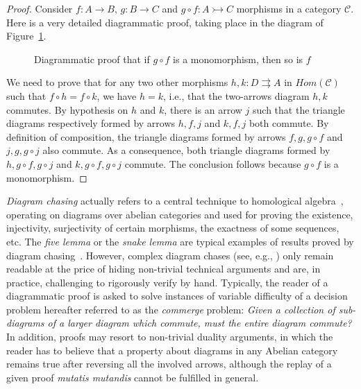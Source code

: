 \documentclass[10pt,a4paper]{article}
\renewcommand{\~}{\widetilde}
\newcommand{\Cat}{\mathcal C}
\begin{document}
\begin{proof}
  Consider $f : A \rightarrow B$, $g : B \rightarrow C$ and $g \circ f : A \rightarrowtail C$ morphisms in a category $\Cat$. Here is a very detailed diagrammatic proof, taking place in the diagram of Figure~\ref{fig:monomonom}.

  \begin{figure}[h!]
    \begin{center}
    \end{center}
    \caption{Diagrammatic proof that if $g \circ f$ is a monomorphism, then so is $f$}\label{fig:monomonom}
  \end{figure}

  We need to prove that for any two other morphisms $h,k : D \rightrightarrows A$ in $Hom(\Cat)$ such that $f \circ h = f \circ k$, we have $h = k$, i.e., that the two-arrows diagram $h, k$ commutes. By hypothesis on $h$ and $k$, there is an arrow $j$ such that the triangle diagrams respectively formed by arrows $h,f, j$ and $k, f, j$ both commute. By definition of composition, the triangle diagrams formed by arrows $f, g, g \circ f$ and $j, g, g \circ j$ also commute. As a consequence, both triangle diagrams formed by $h, g \circ f, g \circ j$ and $k, g \circ f, g \circ j$ commute. The conclusion follows because $g \circ f$ is a monomorphism.
\end{proof}

\emph{Diagram chasing} actually refers to a central technique to homological algebra~\cite{zbMATH00758278,zbMATH01324388}, operating on diagrams over abelian categories and used for proving the existence, injectivity, surjectivity of certain morphisms, the exactness of some sequences, etc. The \emph{five lemma} or the \emph{snake lemma} are typical examples of results proved by diagram chasing~\cite{zbMATH00758278}. However, complex diagram chases (see, e.g., \cite[p.338]{piquerez:tel-03499730}) only remain readable at the price of hiding non-trivial technical arguments and are, in practice, challenging to rigorously verify by hand. Typically, the reader of a diagrammatic proof is asked to solve instances of variable difficulty of a decision problem hereafter referred to as the \emph{commerge} problem: \emph{Given a collection of sub-diagrams of a larger diagram which commute, must the entire diagram commute?} In addition, proofs may resort to non-trivial duality arguments, in which the reader has to believe that a property about diagrams in any Abelian category remains true after reversing all the involved arrows, although the replay of a given proof \emph{mutatis mutandis} cannot be fulfilled in general.
\end{document}
